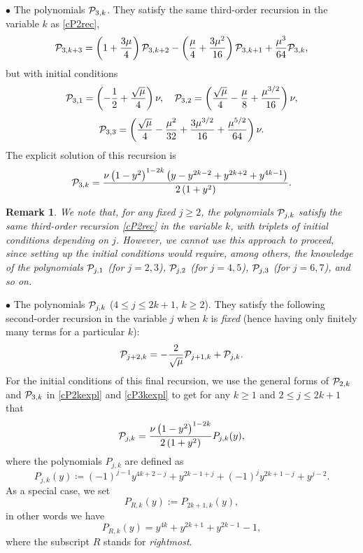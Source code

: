 \documentclass[a4paper]{article}
\newtheorem{remark}{Remark}
\newcommand{\Por}{P_{R,k}(y)}
\newcommand{\cP}{{\cal{P}}}
\begin{document}
$\bullet$  The polynomials $\cP_{3,k}$. They satisfy the same third-order recursion in the variable $k$ as \eqref{cP2rec},
\[
\cP_{3,k+3}=\left(1+\frac{3\mu}{4}\right)\cP_{3,k+2}-\left(\frac{\mu }{4}+\frac{3 \mu ^2}{16}\right)\cP_{3,k+1}+\frac{\mu ^3}{64}\cP_{3,k},
\]
but with initial conditions 
\[
\cP_{3,1}=\left(-\frac{1}{2}+\frac{\sqrt{\mu }}{4}\right) \nu, \quad \cP_{3,2}=\left(\frac{\sqrt{\mu} }{4}-\frac{\mu}{8}+\frac{\mu ^{3/2}}{16}\right) \nu,
\]
\[
\cP_{3,3}=\left(\frac{\sqrt{\mu }}{4}-\frac{\mu ^2}{32}+\frac{3 \mu ^{3/2}}{16}+\frac{\mu ^{5/2}}{64}\right) \nu.
\]
The explicit solution of this recursion is
\begin{equation}\label{cP3kexpl}
\cP_{3,k}=\frac{\nu  \left(1-y^2\right)^{1-2 k} \left(y-y^{2 k-2}+y^{2 k+2}+y^{4 k-1}\right)}{2 \left(1+y^2\right)}.
\end{equation}
\begin{remark}
We note that, for any \emph{fixed} $j\ge 2$, the polynomials $\cP_{j,k}$ satisfy the same third-order recursion \eqref{cP2rec} in the variable $k$, with triplets of initial conditions depending on $j$. However, we cannot use this approach to proceed, since setting up the initial conditions would require, among others, the knowledge of the  polynomials $\cP_{j,1}$ (for $j=2, 3$),  $\cP_{j,2}$ (for $j=4, 5$), $\cP_{j,3}$ (for $j=6, 7$), and so on. 
\end{remark}



$\bullet$  The polynomials $\cP_{j,k}$ ($4\le j\le 2k+1$, $k\ge 2$). They satisfy the following second-order recursion in the variable $j$ when $k$ is \emph{fixed} (hence having only finitely many terms for a particular $k$):  
\[
\cP_{j+2,k}=-\frac{2}{\sqrt{\mu }}\cP_{j+1,k}+\cP_{j,k}.
\]
For the initial conditions of this final recursion, we use the general forms of $\cP_{2,k}$ and $\cP_{3,k}$ in \eqref{cP2kexpl} and \eqref{cP3kexpl} to get for any $k\ge 1$ and $2\le j\le 2k+1$ that 
\begin{equation}\label{Pjkexpl}
\cP_{j,k}=\frac{\nu  \left(1-y^2\right)^{1-2 k}}{2 \left(1+y^2\right)}P_{j,k}(y), 
\end{equation}
where the polynomials $P_{j,k}$ are defined as
\begin{equation}\label{Pjky}
P_{j,k}(y)\coloneqq(-1)^{j-1} y^{4 k+2-j}+y^{2 k-1+j}+(-1)^j y^{2 k+1-j}+y^{j-2}.
\end{equation}
As a special case, we set
\[
\Por:=P_{2k+1,k}(y),
\]
in other words we have
\begin{equation}\label{pordef}
\Por=y^{4 k}+y^{2 k+1}+y^{2 k-1}-1,
\end{equation}
where the subscript $R$ stands for \textit{rightmost}.
\end{document}
